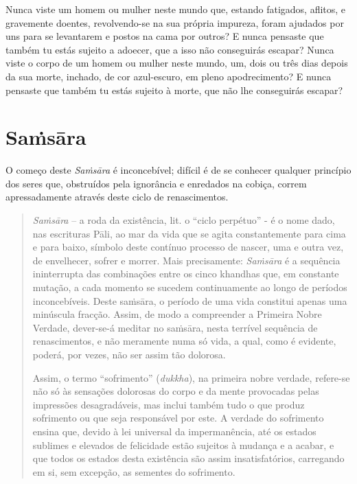 Nunca viste um homem ou mulher neste mundo que, estando fatigados, aflitos, e
gravemente doentes, revolvendo-se na sua própria impureza, foram ajudados por
uns para se levantarem e postos na cama por outros? E nunca pensaste que também
tu estás sujeito a adoecer, que a isso não conseguirás escapar? Nunca viste o
corpo de um homem ou mulher neste mundo, um, dois ou três dias depois da sua
morte, inchado, de cor azul-escuro, em pleno apodrecimento? E nunca pensaste que
também tu estás sujeito à morte, que não lhe conseguirás escapar?


\section{Sa\.{m}sāra}

O começo deste \emph{Saṁsāra} é inconcebível; difícil é de se conhecer qualquer
princípio dos seres que, obstruídos pela ignorância e enredados na cobiça,
correm apressadamente através deste ciclo de renascimentos.


\begin{quote}
  \emph{Sa\.{m}sāra} -- a roda da existência, lit. o ``ciclo perpétuo'' - é o
  nome dado, nas escrituras Pāli, ao mar da vida que se agita constantemente
  para cima e para baixo, símbolo deste contínuo processo de nascer, uma e outra
  vez, de envelhecer, sofrer e morrer. Mais precisamente: \emph{Sa\.{m}sāra} é a
  sequência ininterrupta das combinações entre os cinco khandhas que, em
  constante mutação, a cada momento se sucedem continuamente ao longo de
  períodos inconcebíveis. Deste saṁsāra, o período de uma vida constitui apenas
  uma minúscula fracção. Assim, de modo a compreender a Primeira Nobre Verdade,
  dever-se-á meditar no saṁsāra, nesta terrível sequência de renascimentos, e
  não meramente numa só vida, a qual, como é evidente, poderá, por vezes, não
  ser assim tão dolorosa.

  Assim, o termo ``sofrimento'' (\emph{dukkha}), na primeira nobre verdade,
  refere-se não só às sensações dolorosas do corpo e da mente provocadas pelas
  impressões desagradáveis, mas inclui também tudo o que produz sofrimento ou
  que seja responsável por este. A verdade do sofrimento ensina que, devido à
  lei universal da impermanência, até os estados sublimes e elevados de
  felicidade estão sujeitos à mudança e a acabar, e que todos os estados desta
  existência são assim insatisfatórios, carregando em si, sem excepção, as
  sementes do sofrimento.
\end{quote}

